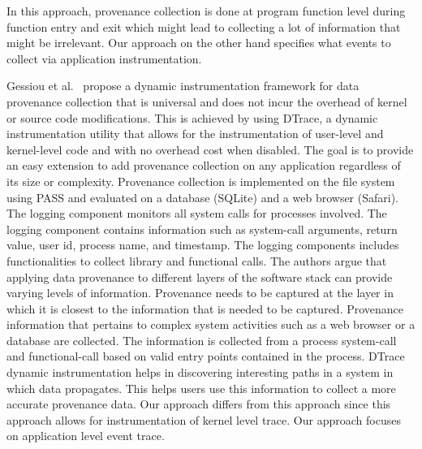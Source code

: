 
In this approach, provenance collection is done at program function level during function entry and exit which might lead to collecting a lot of information that might be irrelevant. Our approach on the other hand specifies what events to collect via application instrumentation. 


Gessiou et al.~\cite{gessiou_towards_2012} propose a dynamic instrumentation framework for data provenance collection that is universal and does not incur the overhead of kernel or source code modifications. This is achieved by using DTrace, a dynamic instrumentation utility that allows for the instrumentation of user-level and kernel-level code and with no overhead cost when disabled. The goal is to provide an easy extension to add provenance collection on any application regardless of its size or complexity. Provenance collection is implemented on the file system using PASS and evaluated on a database (SQLite) and a web browser (Safari). 
The logging component monitors all system calls for processes involved. The logging component contains information such as system-call arguments, return value, user id, process name, and timestamp. The logging components includes functionalities to collect library and functional calls. The authors argue that applying data provenance to different layers of the software stack can provide varying levels of information. Provenance needs to be captured at the layer in which it is closest to the information that is needed to be captured. Provenance information that pertains to complex system activities such as a web browser or a database are collected. The information is collected from a process system-call and functional-call based on valid entry points contained in the process. DTrace dynamic instrumentation helps in discovering interesting paths in a system in which data propagates. This helps users use this information to collect a more accurate provenance data. Our approach differs from this approach since this approach allows for instrumentation of kernel level trace. Our approach focuses on application level event trace.


